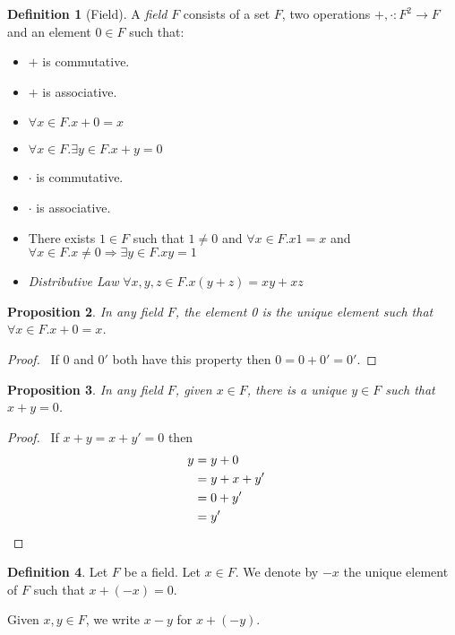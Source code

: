 \documentclass{book}
\let\qed\relax
\newtheorem{prop}{Proposition}[chapter]
\theoremstyle{definition}
\newtheorem{df}[prop]{Definition}
\begin{document}
\begin{df}[Field]
A \emph{field} $F$ consists of a set $F$, two operations $+, \cdot : F^2 \rightarrow F$ and an element $0 \in F$ such that:
\begin{itemize}
\item $+$ is commutative.
\item $+$ is associative.
\item $\forall x \in F. x + 0 = x$
\item $\forall x \in F. \exists y \in F. x + y = 0$
\item $\cdot$ is commutative.
\item $\cdot$ is associative.
\item There exists $1 \in F$ such that $1 \neq 0$ and $\forall x \in F. x1 = x$ and $\forall x \in F. x \neq 0 \Rightarrow \exists y \in F. xy = 1$
\item \emph{Distributive Law} $\forall x,y,z \in F. x(y+z) = xy+xz$
\end{itemize}
\end{df}

\begin{prop}
In any field $F$, the element 0 is the unique element such that $\forall x \in F. x + 0 = x$.
\end{prop}

\begin{proof}
\pf\ If $0$ and $0'$ both have this property then $0 = 0 + 0' = 0'$. \qed
\end{proof}

\begin{prop}
In any field $F$, given $x \in F$, there is a unique $y \in F$ such that $x + y = 0$.
\end{prop}

\begin{proof}
\pf\ If $x + y = x + y' = 0$ then
\begin{align*}
	y & = y + 0 \\
	& = y + x + y' \\
	& = 0 + y' \\
	& = y' & \qed
\end{align*}
\end{proof}

\begin{df}
Let $F$ be a field. Let $x \in F$. We denote by $-x$ the unique element of $F$ such that $x + (-x) = 0$. 

Given $x,y \in F$, we write $x - y$ for $x + (-y)$.
\end{df}
\end{document}
